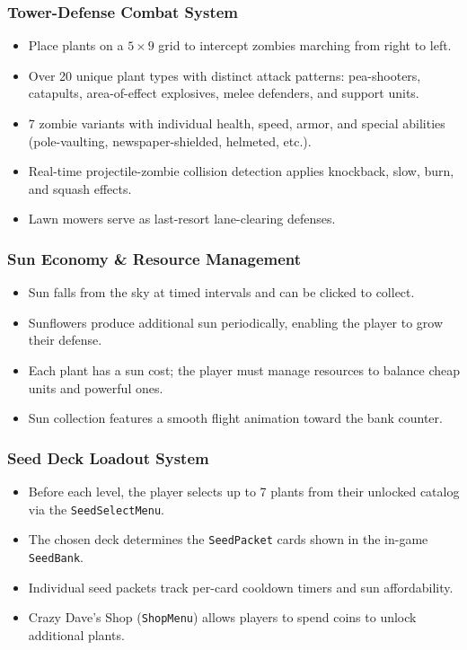 \documentclass[12pt,a4paper]{article}
\begin{document}
\subsubsection{Tower-Defense Combat System}
\begin{itemize}[leftmargin=2em]
    \item Place plants on a $5 \times 9$ grid to intercept zombies marching from right to left.
    \item Over 20 unique plant types with distinct attack patterns: pea-shooters, catapults, area-of-effect explosives, melee defenders, and support units.
    \item 7 zombie variants with individual health, speed, armor, and special abilities (pole-vaulting, newspaper-shielded, helmeted, etc.).
    \item Real-time projectile-zombie collision detection applies knockback, slow, burn, and squash effects.
    \item Lawn mowers serve as last-resort lane-clearing defenses.
\end{itemize}
\subsubsection{Sun Economy \& Resource Management}
\begin{itemize}[leftmargin=2em]
    \item Sun falls from the sky at timed intervals and can be clicked to collect.
    \item Sunflowers produce additional sun periodically, enabling the player to grow their defense.
    \item Each plant has a sun cost; the player must manage resources to balance cheap units and powerful ones.
    \item Sun collection features a smooth flight animation toward the bank counter.
\end{itemize}
\subsubsection{Seed Deck Loadout System}
\begin{itemize}[leftmargin=2em]
    \item Before each level, the player selects up to 7 plants from their unlocked catalog via the \texttt{SeedSelectMenu}.
    \item The chosen deck determines the \texttt{SeedPacket} cards shown in the in-game \texttt{SeedBank}.
    \item Individual seed packets track per-card cooldown timers and sun affordability.
    \item Crazy Dave's Shop (\texttt{ShopMenu}) allows players to spend coins to unlock additional plants.
\end{itemize}
\end{document}
